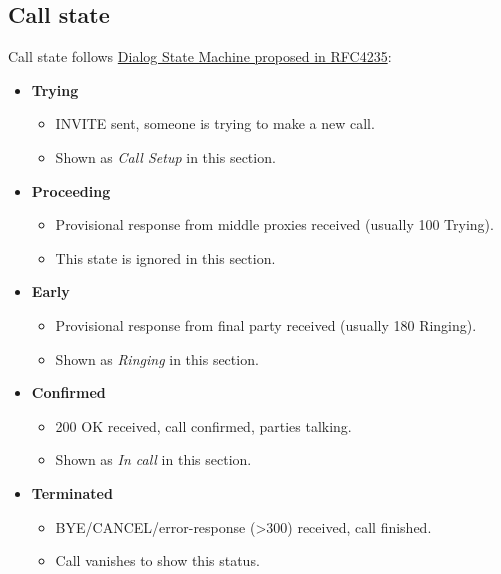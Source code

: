 \documentclass[letterpaper,10pt,english]{sphinxmanual}
\begin{document}
\subsection{Call state}
\label{administration_portal/platform/active_calls:id2}
Call state follows \href{https://tools.ietf.org/html/rfc4235\#section-3.7.1}{Dialog State Machine proposed in RFC4235}:
\begin{itemize}
\item {} 
\textbf{Trying}
\begin{itemize}
\item {} 
INVITE sent, someone is trying to make a new call.

\item {} 
Shown as \emph{Call Setup} in this section.

\end{itemize}

\item {} 
\textbf{Proceeding}
\begin{itemize}
\item {} 
Provisional response from middle proxies received (usually 100 Trying).

\item {} 
This state is ignored in this section.

\end{itemize}

\item {} 
\textbf{Early}
\begin{itemize}
\item {} 
Provisional response from final party received (usually 180 Ringing).

\item {} 
Shown as \emph{Ringing} in this section.

\end{itemize}

\item {} 
\textbf{Confirmed}
\begin{itemize}
\item {} 
200 OK received, call confirmed, parties talking.

\item {} 
Shown as \emph{In call} in this section.

\end{itemize}

\item {} 
\textbf{Terminated}
\begin{itemize}
\item {} 
BYE/CANCEL/error-response (\textgreater{}300) received, call finished.

\item {} 
Call vanishes to show this status.

\end{itemize}

\end{itemize}
\end{document}
